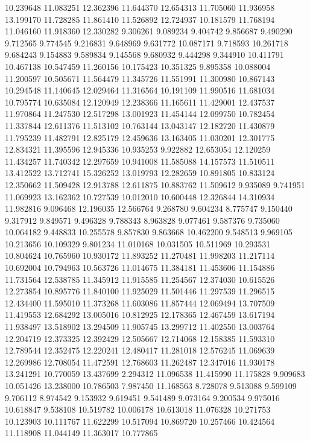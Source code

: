 10.239648
11.083251
12.362396
11.644370
12.654313
11.705060
11.936958
13.199170
11.728285
11.861410
11.526892
12.724937
10.181579
11.768194
11.046160
11.918360
12.330282
9.306261
9.089234
9.404742
9.856687
9.490290
9.712565
9.774545
9.216831
9.648969
9.631772
10.087171
9.718593
10.261718
9.684243
9.154883
9.589834
9.145568
9.680932
9.444298
9.344910
10.411791
10.467138
10.547459
11.260156
10.175423
10.351325
9.895358
10.088004
11.200597
10.505671
11.564479
11.345726
11.551991
11.300980
10.867143
10.294548
11.140645
12.029464
11.316564
10.191109
11.990516
11.681034
10.795774
10.635084
12.120949
12.238366
11.165611
11.429001
12.437537
11.970864
11.247530
12.517298
13.001923
11.454144
12.099750
10.782454
11.337844
12.611376
11.513102
10.763144
13.043147
12.182720
11.430879
11.795239
11.482791
12.825179
12.459636
13.163405
11.030201
12.301775
12.834321
11.395596
12.945336
10.935253
9.922882
12.653054
12.120259
11.434257
11.740342
12.297659
10.941008
11.585088
14.157573
11.510511
13.412522
13.712741
15.326252
13.019793
12.282659
10.891805
10.833124
12.350662
11.509428
12.913788
12.611875
10.883762
11.509612
9.935089
9.741951
11.069923
13.162362
10.727539
10.012010
10.600448
12.326844
14.310934
11.982816
9.096468
12.196035
12.566764
9.268780
9.604234
8.775747
9.150440
9.317912
9.849571
9.496328
9.788343
8.963828
9.077461
9.587376
9.735060
10.064182
9.448833
10.255578
9.857830
9.863668
10.462200
9.548513
9.969105
10.213656
10.109329
9.801234
11.010168
10.031505
10.511969
10.293531
10.804624
10.765960
10.930172
11.893252
11.270481
11.998203
11.217114
10.692004
10.794963
10.563726
11.014675
11.384181
11.453606
11.154886
11.731564
12.538785
11.345912
11.915585
11.254567
12.374030
10.615526
12.273854
10.895776
11.840100
11.925029
11.501446
11.297539
11.296515
12.434400
11.595010
11.373268
11.603086
11.857444
12.069494
13.707509
11.419553
12.684292
13.005016
10.812925
12.178365
12.467459
13.617194
11.938497
13.518902
13.294509
11.905745
13.299712
11.402550
13.003764
12.204719
12.373325
12.392429
12.505667
12.714068
12.158385
11.593310
12.789544
12.352475
12.220241
12.480417
11.281018
12.576245
11.069639
12.269986
12.708054
11.472591
12.768603
11.262487
12.347016
11.930178
13.241291
10.770059
13.437699
2.294312
11.096538
11.415990
11.175828
9.909683
10.051426
13.238000
10.786503
7.987450
11.168563
8.728078
9.513088
9.599109
9.706112
8.974542
9.153932
9.619451
9.541489
9.073164
9.200534
9.975016
10.618847
9.538108
10.519782
10.006178
10.613018
11.076328
10.271753
10.123903
10.111767
11.622299
10.517094
10.869720
10.257466
10.424564
11.118908
11.044149
11.363017
10.777865
